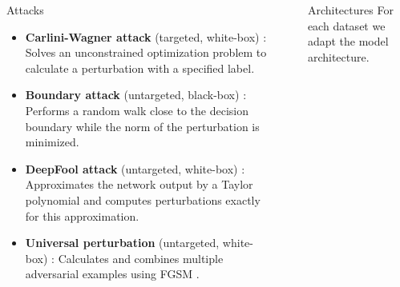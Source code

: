 \documentclass[final]{beamer}
\newlength{\sepwid}
\newlength{\onecolwid}
\newlength{\twocolwid}
\begin{document}
\begin{frame}[t]
\begin{columns}[t]
\begin{column}{\onecolwid}
			\begin{block}{Attacks}
				\begin{itemize}
					\item \textbf{Carlini-Wagner attack} (targeted, white-box) \cite{carlini}: Solves an unconstrained optimization problem to calculate a perturbation with a specified label.
					\item \textbf{Boundary attack} (untargeted, black-box) \cite{boundary}: Performs a random walk close to the
					decision boundary while the norm of the perturbation is minimized.
					\item \textbf{DeepFool attack} (untargeted, white-box) \cite{deepfool}: Approximates the network output by a Taylor polynomial and computes perturbations exactly for this approximation.
					\item \textbf{Universal perturbation} (untargeted, white-box) \cite{universal}: Calculates and combines multiple adversarial examples using FGSM \cite{fgsm}.
				\end{itemize}
			\end{block}
			
			
			
		\end{column} %
		
		\begin{column}{\sepwid}\end{column} %
		
		\begin{column}{\twocolwid} %
			
			\begin{columns}[t,totalwidth=\twocolwid] %
				
				\begin{column}{\onecolwid}\vspace{-.6in} %
					
					
					\begin{block}{Architectures}
						For each dataset we adapt the model architecture.
						\vspace{1cm}
						

\end{block}
\end{column}
\end{columns}
\end{column}
\end{columns}
\end{frame}
\end{document}
